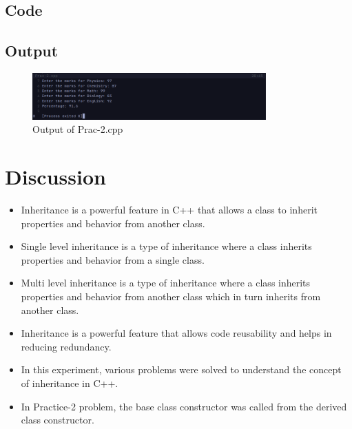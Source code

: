 \documentclass[12pt]{article}
\begin{document}
\subsection*{Code}


\subsection*{Output}
\begin{figure}[htpb]
    \centering
    \includegraphics[width=0.8\textwidth]{Prac-2.png}
    \caption{Output of Prac-2.cpp}
\end{figure}


\FloatBarrier
\section*{Discussion}
\begin{itemize}
    \item Inheritance is a powerful feature in C++ that allows a class to inherit properties and behavior from another class. 
    \item Single level inheritance is a type of inheritance where a class inherits properties and behavior from a single class. 
    \item Multi level inheritance is a type of inheritance where a class inherits properties and behavior from another class which in turn inherits from another class. 
    \item Inheritance is a powerful feature that allows code reusability and helps in reducing redundancy. 
    \item In this experiment, various problems were solved to understand the concept of inheritance in C++. 
    \item In Practice-2 problem, the base class constructor was called from the derived class constructor.
\end{itemize}
\end{document}
